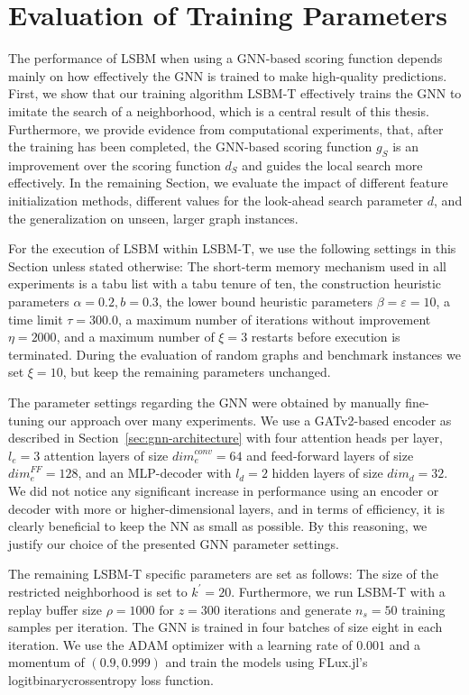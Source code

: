 \documentclass[draft,final]{vutinfth} %
\begin{document}
\section{Evaluation of Training Parameters}\label{sec:lsbm-t}

The performance of LSBM when using a GNN-based scoring function depends mainly on how effectively the GNN is trained to make high-quality predictions. 
First, we show that our training algorithm LSBM-T effectively trains the GNN to imitate the search of a neighborhood, which is a central result of this thesis. Furthermore, we provide evidence from computational experiments, that, after the training has been completed, the GNN-based scoring function $g_S$ is an improvement over the scoring function $d_S$ and guides the local search more effectively. In the remaining Section, we evaluate the impact of different feature initialization methods, different values for the look-ahead search parameter $d$, and the generalization on unseen, larger graph instances. 

For the execution of LSBM within LSBM-T, we use the following settings in this Section unless stated otherwise: The short-term memory mechanism used in all experiments is a tabu list with a tabu tenure of ten, the construction heuristic parameters $\alpha=0.2, b=0.3$, the lower bound heuristic parameters $\beta=\varepsilon=10$, a time limit $\tau=300.0$, a maximum number of iterations without improvement $\eta=2000$, and a maximum number of $\xi = 3$ restarts before execution is terminated. 
During the evaluation of random graphs and benchmark instances we set $\xi = 10$, but keep the remaining parameters unchanged. 

The parameter settings regarding the GNN were obtained by manually fine-tuning our approach over many experiments. We use a GATv2-based encoder as described in Section~\ref{sec:gnn-architecture} with four attention heads per layer, $l_e = 3$ attention layers of size $\mathit{dim}^{conv}_e = 64$ and feed-forward layers of size $\mathit{dim}^{FF}_e = 128$, and an MLP-decoder with $l_d=2$ hidden layers of size $\mathit{dim}_d = 32$. We did not notice any significant increase in performance using an encoder or decoder with more or higher-dimensional layers, and in terms of efficiency, it is clearly beneficial to keep the NN as small as possible. By this reasoning, we justify our choice of the presented GNN parameter settings. 

The remaining LSBM-T specific parameters are set as follows: The size of the restricted neighborhood is set to $k^\prime = 20$.
Furthermore, we run LSBM-T with a replay buffer size $\rho=1000$ for $z=300$ iterations and generate $n_s = 50$ training samples per iteration. The GNN is trained in four batches of size eight in each iteration. We use the ADAM optimizer with a learning rate of $0.001$ and a momentum of $(0.9, 0.999)$ and train the models using FLux.jl's logitbinarycrossentropy loss function. 
\end{document}
